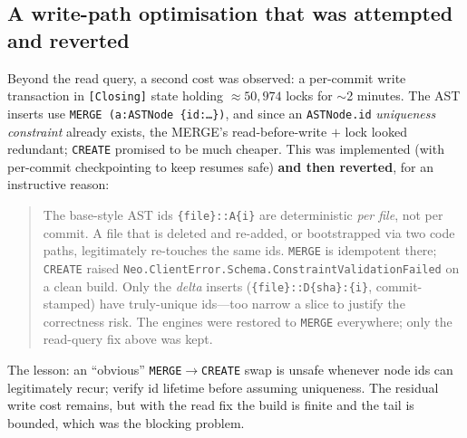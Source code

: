 \documentclass[11pt]{article}
\newcommand{\code}[1]{\texttt{#1}}
\begin{document}
\subsection{A write-path optimisation that was attempted and reverted}
\label{sec:writecost}
Beyond the read query, a second cost was observed: a per-commit write transaction
in \code{[Closing]} state holding $\approx$$50{,}974$ locks for $\sim$2 minutes.
The AST inserts use \code{MERGE (a:ASTNode \{id:\ldots\})}, and since an
\code{ASTNode.id} \emph{uniqueness constraint} already exists, the MERGE's
read-before-write $+$ lock looked redundant; \code{CREATE} promised to be much
cheaper. This was implemented (with per-commit checkpointing to keep resumes
safe) \textbf{and then reverted}, for an instructive reason:

\begin{quote}
The base-style AST ids \code{\{file\}::A\{i\}} are deterministic \emph{per file},
not per commit. A file that is deleted and re-added, or bootstrapped via two code
paths, legitimately re-touches the same ids. \code{MERGE} is idempotent there;
\code{CREATE} raised \code{Neo.ClientError.Schema.ConstraintValidationFailed} on a
clean build. Only the \emph{delta} inserts (\code{\{file\}::D\{sha\}:\{i\}},
commit-stamped) have truly-unique ids---too narrow a slice to justify the
correctness risk. The engines were restored to \code{MERGE} everywhere; only the
read-query fix above was kept.
\end{quote}

The lesson: an ``obvious'' \code{MERGE}$\to$\code{CREATE} swap is unsafe whenever
node ids can legitimately recur; verify id lifetime before assuming uniqueness.
The residual write cost remains, but with the read fix the build is finite and the
tail is bounded, which was the blocking problem.
\end{document}
